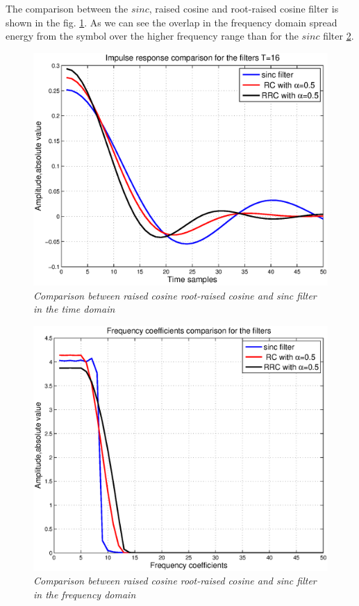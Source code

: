 The comparison between the  $sinc$, raised cosine and root-raised cosine filter is shown in the fig. \ref{fg_5}. As we can see the overlap in the frequency domain spread energy from the symbol over the higher frequency range than for the $sinc$ filter \ref{fg_6}.
\begin{figure}[H]
\centering
\includegraphics[width=0.9\columnwidth]{TIME_comp.eps}
\caption{\textit{Comparison between raised cosine root-raised cosine and sinc filter in the time domain}} \label{fg_5}
\end{figure}
\begin{figure}[H]
\centering
\includegraphics[width=0.9\columnwidth]{FREQ_comp.eps}
\caption{\textit{Comparison between raised cosine root-raised cosine and sinc filter in the frequency domain }} \label{fg_6}
\end{figure}

